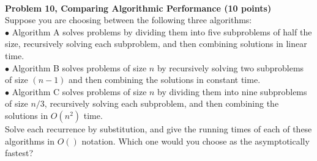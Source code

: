 \documentclass{article}
\begin{document}
\\


\noindent
{\bf Problem 10, Comparing Algorithmic Performance (10 points)}\\
Suppose you are choosing between the following three algorithms:\\
$\bullet$ Algorithm A solves problems by dividing them into five subproblems of half the size, 
recursively solving each subproblem, and then combining solutions in linear time.\\
$\bullet$  Algorithm B solves problems of size $n$ by recursively solving two subproblems of size $(n\! - \! 1)$
and then combining the solutions in constant time.\\
$\bullet$ Algorithm C solves problems of size $n$ by dividing them into nine subproblems of size $n/3$,
recursively solving each subproblem, and then combining the solutions in $O(n^2)$ time.\\
Solve each recurrence by substitution, and give the running times of each of these algorithms 
in $O()$ notation. Which one would you choose as the asymptotically fastest? \\

\end{document}
